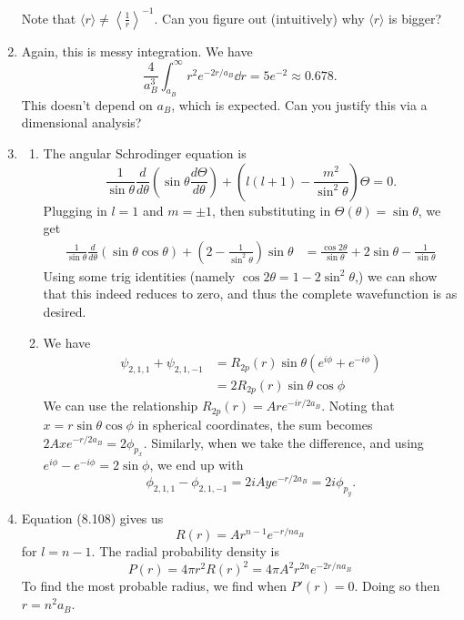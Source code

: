 \documentclass{article}
\begin{document}
\begin{enumerate}[label=(8.\arabic*)]
     Note that $\langle r\rangle \neq \left\langle \frac{1}{r}\right\rangle^{-1}$. Can you figure out (intuitively) why $\langle r\rangle$ is bigger?
    \item Again, this is messy integration. We have
    \begin{equation}
        \frac{4}{a_B^3}\int_{a_B}^{\infty} r^2e^{-2r/a_B} \dd{r} = 5e^{-2} \approx 0.678.
    \end{equation}
     This doesn't depend on $a_B$, which is expected. Can you justify this via a dimensional analysis?
    \setcounter{enumi}{46}
    \item \begin{enumerate}
        \item The angular Schrodinger equation is 
        \begin{equation}
            \frac{1}{\sin\theta}\frac{d}{d\theta}\left(\sin\theta\frac{d\Theta}{d\theta}\right) + \left(l(l+1)-\frac{m^2}{\sin^2\theta}\right)\Theta = 0.
        \end{equation}
        Plugging in $l=1$ and $m= \pm 1$, then substituting in $\Theta(\theta)=\sin\theta$, we get
        \begin{align*}
            \frac{1}{\sin\theta}\frac{d}{d\theta} \left(\sin\theta \cos\theta\right) + \left(2-\frac{1}{\sin^2\theta}\right)\sin\theta &= \frac{\cos2\theta}{\sin\theta} + 2\sin\theta - \frac{1}{\sin\theta}
        \end{align*}
        Using some trig identities (namely $\cos2\theta = 1-2\sin^2\theta$,) we can show that this indeed reduces to zero, and thus the complete wavefunction is as desired.
    \item We have
    \begin{align}
        \psi_{2,1,1} + \psi_{2,1,-1} &= R_{2p}(r)\sin\theta\left(e^{i\phi}+e^{-i\phi}\right) \\
        &= 2R_{2p}(r)\sin\theta\cos\phi
    \end{align}
    We can use the relationship $R_{2p}(r) = Are^{-ir/2a_B}.$ Noting that $x=r\sin\theta\cos\phi$ in spherical coordinates, the sum becomes $2Axe^{-r/2a_B} = 2\phi_{p_x}.$ Similarly, when we take the difference, and using $e^{i\phi}-e^{-i\phi} = 2\sin\phi$, we end up with 
    \begin{equation}
        \phi_{2,1,1}-\phi_{2,1,-1} = 2iAye^{-r/2a_B} = 2i\phi_{p_y}.
    \end{equation}
    \end{enumerate}
    \setcounter{enumi}{48}
    \item Equation (8.108) gives us
    \begin{equation}
        R(r) = Ar^{n-1}e^{-r/na_B}
    \end{equation}
    for $l=n-1$. The radial probability density is 
    \begin{equation}
        P(r) = 4\pi r^2 R(r)^2 = 4\pi A^2 r^{2n}e^{-2r/na_B}
    \end{equation}
    To find the most probable radius, we find when $P'(r)=0.$ Doing so then $r=n^2a_B.$


\end{enumerate}
\end{document}

